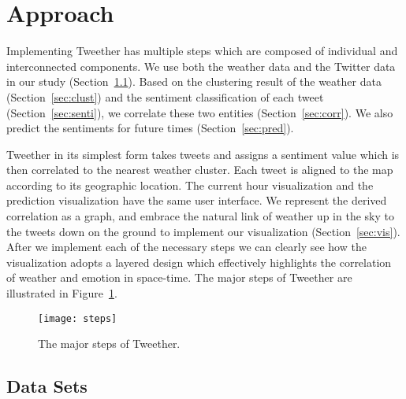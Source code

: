 \section{Approach}

Implementing Tweether has multiple steps which are composed of individual and interconnected components. We use both the weather data and the Twitter data in our study (Section~\ref{sec:dataset}). Based on the clustering result of the weather data (Section~\ref{sec:clust}) and the sentiment classification of each tweet (Section~\ref{sec:senti}), we correlate these two entities (Section~\ref{sec:corr}). We also predict the sentiments for future times (Section~\ref{sec:pred}).

Tweether in its simplest form takes tweets and assigns a sentiment value which is then correlated to the nearest weather cluster. Each tweet is aligned to the map according to its geographic location. The current hour visualization and the prediction visualization have the same user interface. We represent the derived correlation as a graph, and embrace the natural link of weather up in the sky to the tweets down on the ground to implement our visualization (Section~\ref{sec:vis}). After we implement each of the necessary steps we can clearly see how the visualization adopts a layered design which effectively highlights the correlation of weather and emotion in space-time. The major steps of Tweether are illustrated in Figure~\ref{fig:steps}.

\begin{figure}[t]
 \centering
 \texttt{[image: steps]}
 \caption{The major steps of Tweether.}
 \label{fig:steps}
\end{figure}



\subsection{Data Sets}
\label{sec:dataset}

